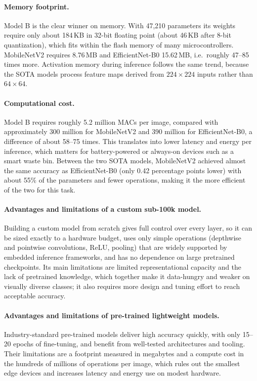 \documentclass[12pt,a4paper]{article}
\begin{document}
\paragraph{Memory footprint.}
Model B is the clear winner on memory. With 47,210 parameters its
weights require only about 184\,KB in 32-bit floating point (about 46\,KB
after 8-bit quantization), which fits within the flash memory of many
microcontrollers. MobileNetV2 requires 8.76\,MB and EfficientNet-B0
15.62\,MB, i.e.\ roughly 47--85 times more.  Activation memory during inference follows the same trend,
because the SOTA models process feature maps derived from $224\times224$
inputs rather than $64\times64$.

\paragraph{Computational cost.}
Model B requires roughly 5.2 million MACs per image, compared with
approximately 300 million for MobileNetV2 and 390 million for
EfficientNet-B0, a difference of about 58--75 times. This translates into
lower latency and energy per inference, which matters for battery-powered
or always-on devices such as a smart waste bin. Between the two SOTA
models, MobileNetV2 achieved almost the same accuracy as EfficientNet-B0
(only 0.42 percentage points lower) with about 55\% of the parameters and
fewer operations, making it the more efficient of the two for this task.

\paragraph{Advantages and limitations of a custom sub-100k model.}
Building a custom model from scratch gives full control over every layer,
so it can be sized exactly to a hardware budget, uses only simple
operations (depthwise and pointwise convolutions, ReLU, pooling) that are
widely supported by embedded inference frameworks, and has no dependence
on large pretrained checkpoints. Its main limitations are limited
representational capacity and the lack of pretrained knowledge, which
together make it data-hungry and weaker on visually diverse classes; it
also requires more design and tuning effort to reach acceptable accuracy.

\paragraph{Advantages and limitations of pre-trained lightweight models.}
Industry-standard pre-trained models deliver high accuracy quickly, with
only 15--20 epochs of fine-tuning, and benefit from well-tested
architectures and tooling. Their limitations are a footprint measured in
megabytes and a compute cost in the hundreds of millions of operations
per image, which rules out the smallest edge devices and increases
latency and energy use on modest hardware.
\end{document}
